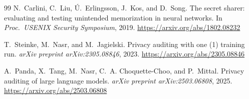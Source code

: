 \documentclass[11pt,a4paper]{article}
\theoremstyle{definition}
\begin{document}
\begin{thebibliography}{99}
 N.~Carlini, C.~Liu, \'U.~Erlingsson, J.~Kos, and D.~Song. The secret
sharer: evaluating and testing unintended memorization in neural networks. In \emph{Proc.\ USENIX
Security Symposium}, 2019. \url{https://arxiv.org/abs/1802.08232}

 T.~Steinke, M.~Nasr, and M.~Jagielski. Privacy auditing with one (1)
training run. \emph{arXiv preprint arXiv:2305.08846}, 2023.
\url{https://arxiv.org/abs/2305.08846}

 A.~Panda, X.~Tang, M.~Nasr, C.~A. Choquette-Choo, and P.~Mittal.
Privacy auditing of large language models. \emph{arXiv preprint arXiv:2503.06808}, 2025.
\url{https://arxiv.org/abs/2503.06808}
\end{thebibliography}
\end{document}
